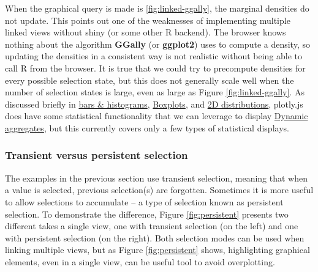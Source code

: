 \documentclass[12pt,]{isuthesis}
\newenvironment{Shaded}{\begin{snugshade}}{\end{snugshade}}
\newcommand{\KeywordTok}[1]{\textcolor[rgb]{0.13,0.29,0.53}{\textbf{{#1}}}}
\newcommand{\DataTypeTok}[1]{\textcolor[rgb]{0.13,0.29,0.53}{{#1}}}
\newcommand{\StringTok}[1]{\textcolor[rgb]{0.31,0.60,0.02}{{#1}}}
\newcommand{\OtherTok}[1]{\textcolor[rgb]{0.56,0.35,0.01}{{#1}}}
\newcommand{\NormalTok}[1]{{#1}}
\begin{document}
When the graphical query is made is \ref{fig:linked-ggally}, the
marginal densities do not update. This points out one of the weaknesses
of implementing multiple linked views without shiny (or some other R
backend). The browser knows nothing about the algorithm \textbf{GGally}
(or \textbf{ggplot2}) uses to compute a density, so updating the
densities in a consistent way is not realistic without being able to
call R from the browser. It is true that we could try to precompute
densities for every possible selection state, but this does not
generally scale well when the number of selection states is large, even
as large as Figure \ref{fig:linked-ggally}. As discussed briefly in
\protect\hyperlink{bars-histograms}{bars \& histograms},
\protect\hyperlink{boxplots}{Boxplots}, and
\protect\hyperlink{2D-distributions}{2D distributions}, plotly.js does
have some statistical functionality that we can leverage to display
\protect\hyperlink{dynamic-aggregates}{Dynamic aggregates}, but this
currently covers only a few types of statistical displays.

\hypertarget{transient-versus-persistent-selection}{\subsubsection{Transient
versus persistent
selection}\label{transient-versus-persistent-selection}}

The examples in the previous section use transient selection, meaning
that when a value is selected, previous selection(s) are forgotten.
Sometimes it is more useful to allow selections to accumulate -- a type
of selection known as persistent selection. To demonstrate the
difference, Figure \ref{fig:persistent} presents two different takes a
single view, one with transient selection (on the left) and one with
persistent selection (on the right). Both selection modes can be used
when linking multiple views, but as Figure \ref{fig:persistent} shows,
highlighting graphical elements, even in a single view, can be useful
tool to avoid overplotting.

\begin{Shaded}
\end{Shaded}
\end{document}
